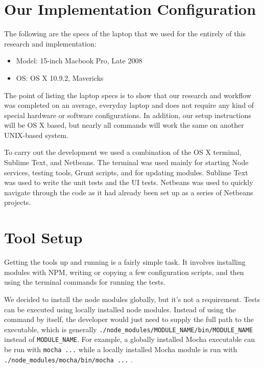 \documentclass[12pt]{ucthesis}
\begin{document}
\section{Our Implementation Configuration}
The following are the specs of the laptop that we used for the entirely of this research and implementation:
\begin{itemize}
  \item Model: 15-inch Macbook Pro, Late 2008
  \item OS: OS X 10.9.2, Mavericks
\end{itemize}
The point of listing the laptop specs is to show that our research and workflow was completed on an average, everyday laptop and does not require any kind of special hardware or software configurations. In addition, our setup instructions will be OS X based, but nearly all commands will work the same on another UNIX-based system.

To carry out the development we used a combination of the OS X terminal, Sublime Text, and Netbeans. The terminal was used mainly for starting Node services, testing tools, Grunt scripts, and for updating modules. Sublime Text was used to write the unit tests and the UI tests. Netbeans was used to quickly navigate through the code as it had already been set up as a series of Netbeans projects.

\section{Tool Setup}
Getting the tools up and running is a fairly simple task. It involves installing modules with NPM, writing or copying a few configuration scripts, and then using the terminal commands for running the tests.

We decided to install the node modules globally, but it's not a requirement. Tests can be executed using locally installed node modules. Instead of using the command by itself, the developer would just need to supply the full path to the executable, which is generally \lstinline{./node_modules/MODULE_NAME/bin/MODULE_NAME} \space instead of \lstinline{MODULE_NAME}. For example, a globally installed Mocha executable can be run with \lstinline{mocha ...} while a locally installed Mocha module is run with \lstinline{./node_modules/mocha/bin/mocha ...} \space .
\end{document}
